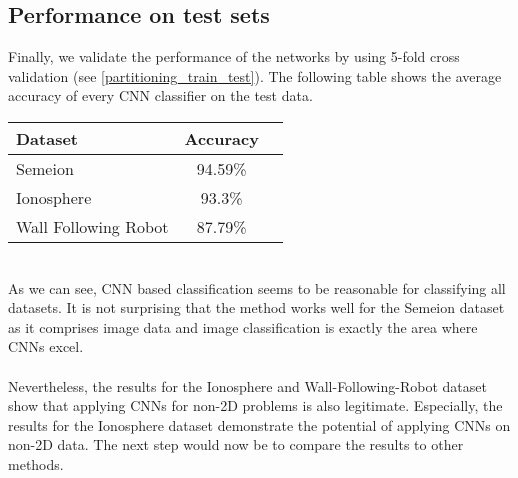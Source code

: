 \documentclass[a4paper, 11pt, twoside, openright]{article}
\begin{document}
\subsection{Performance on test sets}
Finally, we validate the performance of the networks by using 5-fold cross validation (see \ref{partitioning_train_test}).
The following table shows the average accuracy of every CNN classifier on the test data.
\vspace*{5mm}
\begin{table}[h!]
	\centering
	\begin{tabular}{ | l | c | c | }
		\hline
	  \textbf{Dataset} & \textbf{Accuracy} \\
		\hline
	  Semeion & 94.59\% \\
		\hline
	  Ionosphere & 93.3\% \\
		\hline
		Wall Following Robot & 87.79\% \\
		\hline
	\end{tabular}
\end{table}
\\
As we can see, CNN based classification seems to be reasonable for classifying all datasets. It is not surprising that the method works well for the Semeion dataset as it comprises image data and image classification is exactly the area where CNNs excel.\\ \\
Nevertheless, the results for the Ionosphere and Wall-Following-Robot dataset show that applying CNNs for non-2D problems is also legitimate. Especially, the results for the Ionosphere dataset demonstrate the potential of applying CNNs on non-2D data. The next step would now be to compare the results to other methods.
\end{document}
